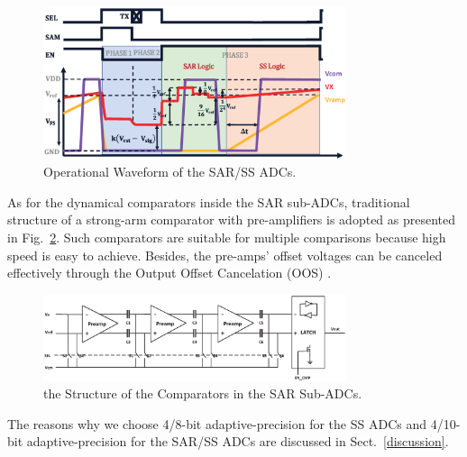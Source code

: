 \begin{figure}[htbp]
	\centerline{\includegraphics[width=3.5in]{./Figures/SARWAVE.eps}}
	\caption{Operational Waveform of the SAR/SS ADCs.}
	\label{SARWAVE}
\end{figure} 

As for the dynamical comparators inside the SAR sub-ADCs, traditional structure of a strong-arm comparator with pre-amplifiers is adopted as presented in Fig.~\ref{LATCH}. Such comparators 
are suitable for multiple comparisons because high speed is easy to achieve. Besides, the pre-amps’ offset voltages can be canceled effectively through the Output Offset Cancelation (OOS) \cite{razavi_design_1992}.

\begin{figure}[htbp]
	\centerline{\includegraphics[width=3.5in]{./Figures/LATCH.eps}}
	\caption{the Structure of the Comparators in the SAR Sub-ADCs.}
	\label{LATCH}
\end{figure} 

The reasons why we choose 4/8-bit adaptive-precision for the SS ADCs and 4/10-bit adaptive-precision for the SAR/SS ADCs are discussed in Sect.~\ref{discussion}.
